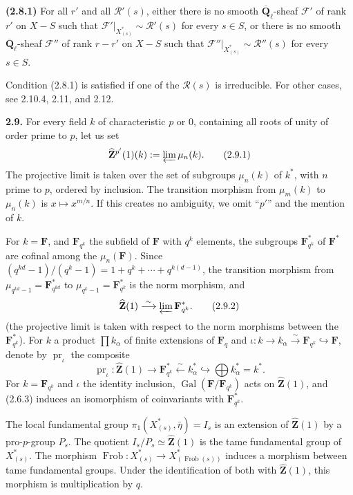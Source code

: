 \documentclass[11pt]{article}
\newcommand{\Fq}{\mathbf{F}_q}
\newcommand{\F}{\mathbf{F}}
\newcommand{\Qbl}{\overline{\mathbf{Q}}_{\ell}}
\newcommand{\Gal}{\operatorname{Gal}}
\newcommand{\Frob}{\operatorname{Frob}}
\newcommand{\Zhat}{\widehat{\mathbf{Z}}}
\newcommand{\pr}{\operatorname{pr}}
\newcommand{\Rcal}{\mathcal{R}}
\newcommand{\Fcal}{\mathcal{F}}
\newcommand{\para}[1]{\medskip\noindent\textbf{#1}\enspace}
\begin{document}
\para{(2.8.1)} For all \(r'\) and all \(\Rcal'(s)\), either there is no smooth \(\Qbl\)-sheaf \(\Fcal'\) of rank \(r'\) on \(X-S\) such that \(\Fcal'|_{X^*_{(s)}}\sim \Rcal'(s)\) for every \(s\in S\), or there is no smooth \(\Qbl\)-sheaf \(\Fcal''\) of rank \(r-r'\) on \(X-S\) such that \(\Fcal''|_{X^*_{(s)}}\sim \Rcal''(s)\) for every \(s\in S\).

Condition (2.8.1) is satisfied if one of the \(\Rcal(s)\) is irreducible. For other cases, see 2.10.4, 2.11, and 2.12.

\para{2.9.} For every field \(k\) of characteristic \(p\) or \(0\), containing all roots of unity of order prime to \(p\), let us set
\begin{equation}
\Zhat^{p'}(1)(k):=\varprojlim \mu_n(k).
\tag{2.9.1}
\end{equation}
The projective limit is taken over the set of subgroups \(\mu_n(k)\) of \(k^*\), with \(n\) prime to \(p\), ordered by inclusion. The transition morphism from \(\mu_m(k)\) to \(\mu_n(k)\) is \(x\mapsto x^{m/n}\). If this creates no ambiguity, we omit ``\(p'\)'' and the mention of \(k\).

For \(k=\F\), and \(\F_{q^k}\) the subfield of \(\F\) with \(q^k\) elements, the subgroups \(\F_{q^k}^*\) of \(\F^*\) are cofinal among the \(\mu_n(\F)\). Since \((q^{kd}-1)/(q^k-1)=1+q^k+\cdots+q^{k(d-1)}\), the transition morphism from \(\mu_{q^{kd}-1}=\F_{q^{kd}}^*\) to \(\mu_{q^k-1}=\F_{q^k}^*\) is the norm morphism, and
\begin{equation}
\Zhat(1)\overset{\sim}{\longrightarrow}\varprojlim \F_{q^k}^*.
\tag{2.9.2}
\end{equation}
(the projective limit is taken with respect to the norm morphisms between the \(\F_{q^k}^*\)). For \(k\) a product \(\prod k_\alpha\) of finite extensions of \(\Fq\) and \(\iota:k\to k_\alpha\overset{\sim}{\to}\F_{q^k}\hookrightarrow\F\), denote by \(\pr_\iota\) the composite
\begin{equation}
\pr_\iota:\Zhat(1)\longrightarrow \F_{q^k}^*\overset{\sim}{\longleftarrow}k_\alpha^*\hookrightarrow \bigoplus k_\alpha^*=k^*.
\tag{2.9.3}
\end{equation}
For \(k=\F_{q^k}\) and \(\iota\) the identity inclusion, \(\Gal(\F/\F_{q^k})\) acts on \(\Zhat(1)\), and (2.6.3) induces an isomorphism of coinvariants with \(\F_{q^k}^*\).

The local fundamental group \(\pi_1(X^*_{(s)},\bar\eta)=I_s\) is an extension of \(\Zhat(1)\) by a pro-\(p\)-group \(P_s\). The quotient \(I_s/P_s\simeq\Zhat(1)\) is the tame fundamental group of \(X^*_{(s)}\). The morphism \(\Frob:X^*_{(s)}\to X^*_{(\Frob(s))}\) induces a morphism between tame fundamental groups. Under the identification of both with \(\Zhat(1)\), this morphism is multiplication by \(q\).
\end{document}
